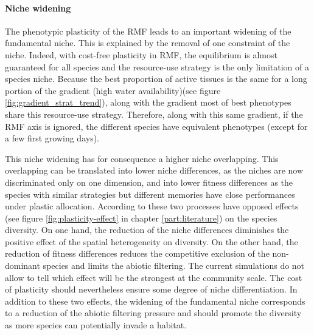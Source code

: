 


\paragraph{Niche widening}

The phenotypic plasticity of the RMF leads to an important widening of the fundamental niche. This is explained by the removal of one constraint of the niche. Indeed, with cost-free plasticity in RMF, the equilibrium is almost guaranteed for all species and the resource-use strategy is the only limitation of a species niche. Because the best proportion of active tissues is the same for a long portion of the gradient (high water availability)(see figure \ref{fig:gradient_strat_trend}), along with the gradient most of best phenotypes share this resource-use strategy. Therefore, along with this same gradient, if the RMF axis is ignored, the different species have equivalent phenotypes (except for a few first growing days).

This niche widening has for consequence a higher niche overlapping. This overlapping can be translated into lower niche differences, as the niches are now discriminated only on one dimension, and into lower fitness differences as the species with similar strategies but different memories have close performances under plastic allocation. According to \citet{turcotte_phenotypic_2016} these two processes have opposed effects (see figure \ref{fig:plasticity-effect} in chapter \ref{part:literature}) on the species diversity. On one hand, the reduction of the niche differences diminishes the positive effect of the spatial heterogeneity on diversity. On the other hand, the reduction of fitness differences reduces the competitive exclusion of the non-dominant species and limits the abiotic filtering. The current simulations do not allow to tell which effect will be the strongest at the community scale. The cost of plasticity should nevertheless ensure some degree of niche differentiation. In addition to these two effects, the widening of the fundamental niche corresponds to a reduction of the abiotic filtering pressure and should promote the diversity as more species can potentially invade a habitat. 

